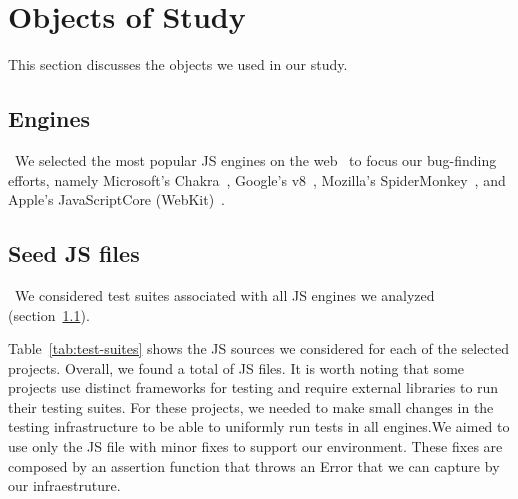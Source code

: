 \documentclass[10pt,conference,anonymous]{IEEEtran}
\begin{document}
\section{Objects of Study}
\label{sec:methodology}

This section discusses the objects we used in our study.

\subsection{Engines}
\label{sec:methodology:engines}~We selected the most popular JS
engines on the web~ to focus our bug-finding efforts, namely
Microsoft's Chakra~\cite{chakra2018repo}, Google's
v8~\cite{v82018repo}, Mozilla's
SpiderMonkey~\cite{spidermonkey2018repo}, and Apple's JavaScriptCore
(WebKit)~\cite{jsc2018repo}.

\subsection{Seed JS files\label{sec:seeds}}~We considered test suites
associated with all  JS engines we analyzed
(section~\ref{sec:methodology:engines}).

Table~\ref{tab:test-suites} shows the JS sources we considered for
each of the selected projects.  Overall, we found a total of \totfiles{} JS
files. It is worth noting that some projects use distinct frameworks for
testing and require external libraries to run their testing
suites. For these projects, we needed to make small changes in the testing
infrastructure to be able to uniformly run tests in all
engines.We aimed to use only the JS file with minor fixes
to support our environment. These fixes are composed by an assertion
function that throws an Error that we can capture by our
infraestruture.
\end{document}
